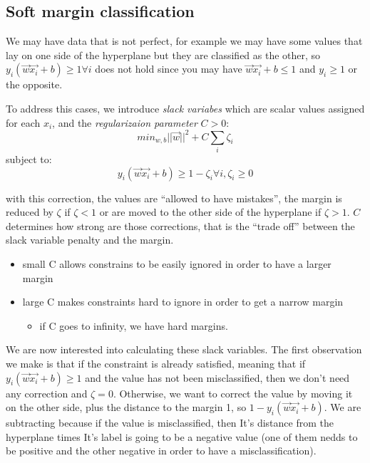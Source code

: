 \documentclass[11pt]{article}
\begin{document}
\subsection{Soft margin
classification}\label{soft-margin-classification}

We may have data that is not perfect, for example we may have some
values that lay on one side of the hyperplane but they are classified as
the other, so \(y_i(\vec{w}\vec{x_i}+b) \ge 1 \forall i\) does not hold
since you may have \(\vec{w}\vec{x_i}+b \le 1\) and \(y_i \ge 1\) or the
opposite.

To address this cases, we introduce \emph{slack variabes} which are
scalar values assigned for each \(x_i\), and the \emph{regularizaion
parameter} \(C > 0\):
\[ min_{w, b} ||\vec{w}||^2 + C \sum_{i} \zeta_i \] subject to:
\[y_i(\vec{w}\vec{x_i} + b) \ge 1 - \zeta_i \forall i, \zeta_i \ge 0\]

with this correction, the values are ``allowed to have mistakes'', the
margin is reduced by \(\zeta\) if \(\zeta < 1\) or are moved to the
other side of the hyperplane if \(\zeta > 1\). \(C\) determines how
strong are those corrections, that is the ``trade off'' between the
slack variable penalty and the margin.

\begin{itemize}
\tightlist
\item
  small C allows constrains to be easily ignored in order to have a
  larger margin
\item
  large C makes constraints hard to ignore in order to get a narrow
  margin

  \begin{itemize}
  \tightlist
  \item
    if C goes to infinity, we have hard margins.
  \end{itemize}
\end{itemize}

We are now interested into calculating these slack variables. The first
observation we make is that if the constraint is already satisfied,
meaning that if \(y_i(\vec{w}\vec{x_i} + b) \ge 1\) and the value has
not been misclassified, then we don't need any correction and
\(\zeta = 0\). Otherwise, we want to correct the value by moving it on
the other side, plus the distance to the margin 1, so
\(1 - y_i(\vec{w}\vec{x_i}+b)\). We are subtracting because if the value
is misclassified, then It's distance from the hyperplane times It's
label is going to be a negative value (one of them nedds to be positive
and the other negative in order to have a misclassification).
\end{document}
